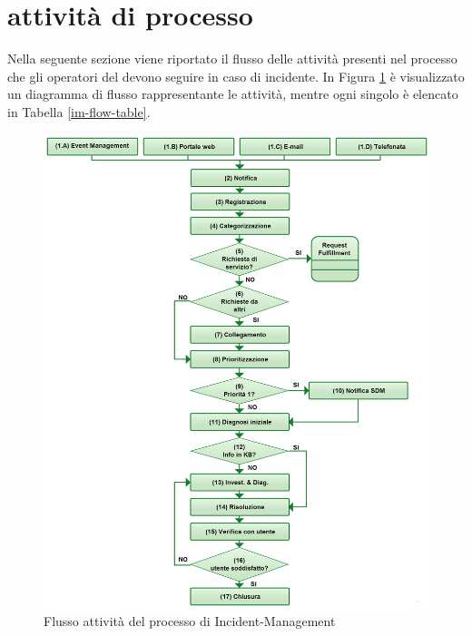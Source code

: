 %
%
\section[Attività di processo]{attività di processo}
\label{im-flow}
Nella seguente sezione viene riportato il flusso delle attività presenti nel processo che gli operatori del  devono seguire in caso di incidente. In Figura \ref{im-flow-img} è visualizzato un diagramma di flusso rappresentante le attività, mentre ogni singolo  è elencato in Tabella \ref{im-flow-table}.

\begin{figure}[htbp]
\centering
\includegraphics[scale=0.3]{Images/Diagrams/IncidentManagement.png}
\caption{Flusso attività del processo di \ac{Incident-Management}}
\label{im-flow-img}
\end{figure}

